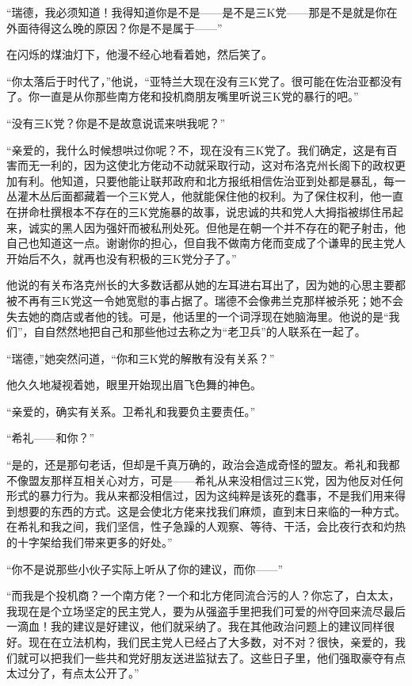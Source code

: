 \par “瑞德，我必须知道！我得知道你是不是——是不是三K党——那是不是就是你在外面待得这么晚的原因？你是不是属于——”
\par 在闪烁的煤油灯下，他漫不经心地看着她，然后笑了。
\par “你太落后于时代了，”他说，“亚特兰大现在没有三K党了。很可能在佐治亚都没有了。你一直是从你那些南方佬和投机商朋友嘴里听说三K党的暴行的吧。”
\par “没有三K党？你是不是故意说谎来哄我呢？”
\par “亲爱的，我什么时候想哄过你呢？不，现在没有三K党了。我们确定，这是有百害而无一利的，因为这使北方佬动不动就采取行动，这对布洛克州长阁下的政权更加有利。他知道，只要他能让联邦政府和北方报纸相信佐治亚到处都是暴乱，每一丛灌木丛后面都藏着一个三K党人，他就能保住他的权利。为了保住权利，他一直在拼命杜撰根本不存在的三K党施暴的故事，说忠诚的共和党人大拇指被绑住吊起来，诚实的黑人因为强奸而被私刑处死。但他是在朝一个并不存在的靶子射击，他自己也知道这一点。谢谢你的担心，但自我不做南方佬而变成了个谦卑的民主党人开始后不久，就再也没有积极的三K党分子了。”
\par 他说的有关布洛克州长的大多数话都从她的左耳进右耳出了，因为她的心思主要都被不再有三K党这一令她宽慰的事占据了。瑞德不会像弗兰克那样被杀死；她不会失去她的商店或者他的钱。可是，他话里的一个词浮现在她脑海里。他说的是“我们”，自自然然地把自己和那些他过去称之为“老卫兵”的人联系在一起了。
\par “瑞德，”她突然问道，“你和三K党的解散有没有关系？”
\par 他久久地凝视着她，眼里开始现出眉飞色舞的神色。
\par “亲爱的，确实有关系。卫希礼和我要负主要责任。”
\par “希礼——和你？”
\par “是的，还是那句老话，但却是千真万确的，政治会造成奇怪的盟友。希礼和我都不像盟友那样互相关心对方，可是——希礼从来没相信过三K党，因为他反对任何形式的暴力行为。我从来都没相信过，因为这纯粹是该死的蠢事，不是我们用来得到想要的东西的方式。这是会使北方佬来找我们麻烦，直到末日来临的一种方式。在希礼和我之间，我们坚信，性子急躁的人观察、等待、干活，会比夜行衣和灼热的十字架给我们带来更多的好处。”
\par “你不是说那些小伙子实际上听从了你的建议，而你——”
\par “而我是个投机商？一个南方佬？一个和北方佬同流合污的人？你忘了，白太太，我现在是个立场坚定的民主党人，要为从强盗手里把我们可爱的州夺回来流尽最后一滴血！我的建议是好建议，他们就采纳了。我在其他政治问题上的建议同样很好。现在在立法机构，我们民主党人已经占了大多数，对不对？很快，亲爱的，我们就可以把我们一些共和党好朋友送进监狱去了。这些日子里，他们强取豪夺有点太过分了，有点太公开了。”
